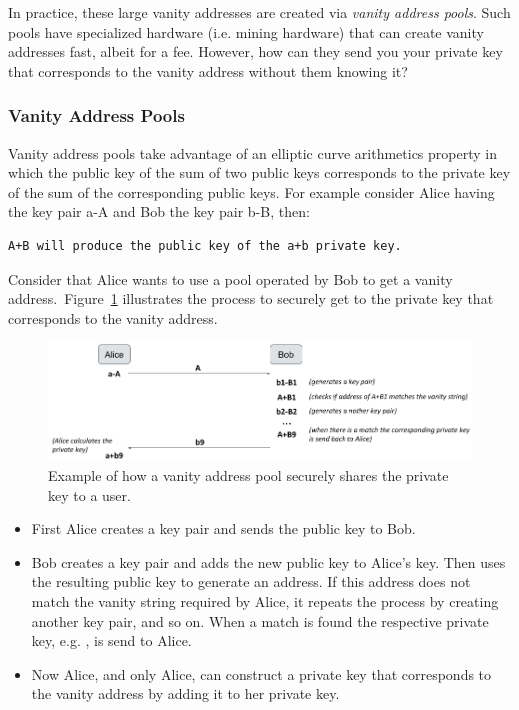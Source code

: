 In practice, these large vanity addresses are created via \emph{vanity address pools}. Such pools have specialized hardware (i.e. mining hardware) that can create vanity addresses fast, albeit for a fee. However, how can they send you your private key that corresponds to the vanity address without them knowing it?

\subsubsection*{Vanity Address Pools}
Vanity address pools take advantage of an elliptic curve arithmetics property in which the public key of the sum of two public keys corresponds to the private key of the sum of the corresponding public keys. For example consider Alice having the key pair a-A and Bob the key pair b-B, then:

\begin{emphbox}
\begin{lstlisting}[style=Pseudomath]
A+B will produce the public key of the a+b private key.
\end{lstlisting}
\end{emphbox}

Consider that Alice wants to use a pool operated by Bob to get a vanity address. Figure~\ref{fig:vanity-address-pools} illustrates the process to securely get to the private key that corresponds to the vanity address.

\begin{figure}[h]
\begin{center}
\includegraphics[scale=0.5]{images/vanity-address-pools}
\caption{Example of how a vanity address pool securely shares the private key to a user.}
\label{fig:vanity-address-pools}
\end{center}
\end{figure}

\begin{itemize}
\item First Alice creates a key pair and sends the public key  to Bob.
\item Bob creates a key pair and adds the new public key  to Alice's key. Then uses the resulting public key to generate an address. If this address does not match the vanity string required by Alice, it repeats the process by creating another key pair, and so on. When a match is found the respective private key, e.g. , is send to Alice.
\item Now Alice, and only Alice, can construct a private key that corresponds to the vanity address by adding it to her private key. 
\end{itemize}




